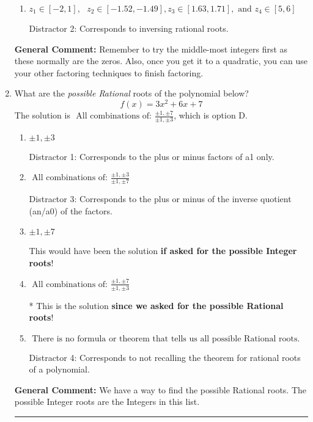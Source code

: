 \documentclass{extbook}[14pt]
\newcommand{\litem}[1]{\item #1

\rule{\textwidth}{0.4pt}}
\begin{document}
\begin{enumerate}
{\begin{enumerate}[label=\Alph*.]
* This is the solution!
\item \( z_1 \in [-2, 1], \text{   }  z_2 \in [-1.52, -1.49], z_3 \in [1.63, 1.71], \text{   and   } z_4 \in [5, 6] \)

 Distractor 2: Corresponds to inversing rational roots.
\end{enumerate}

\textbf{General Comment:} Remember to try the middle-most integers first as these normally are the zeros. Also, once you get it to a quadratic, you can use your other factoring techniques to finish factoring.
}
\litem{
What are the \textit{possible Rational} roots of the polynomial below?
\[ f(x) = 3x^{2} +6 x + 7 \]The solution is \( \text{ All combinations of: }\frac{\pm 1,\pm 7}{\pm 1,\pm 3} \), which is option D.\begin{enumerate}[label=\Alph*.]
\item \( \pm 1,\pm 3 \)

 Distractor 1: Corresponds to the plus or minus factors of a1 only.
\item \( \text{ All combinations of: }\frac{\pm 1,\pm 3}{\pm 1,\pm 7} \)

 Distractor 3: Corresponds to the plus or minus of the inverse quotient (an/a0) of the factors. 
\item \( \pm 1,\pm 7 \)

This would have been the solution \textbf{if asked for the possible Integer roots}!
\item \( \text{ All combinations of: }\frac{\pm 1,\pm 7}{\pm 1,\pm 3} \)

* This is the solution \textbf{since we asked for the possible Rational roots}!
\item \( \text{ There is no formula or theorem that tells us all possible Rational roots.} \)

 Distractor 4: Corresponds to not recalling the theorem for rational roots of a polynomial.
\end{enumerate}

\textbf{General Comment:} We have a way to find the possible Rational roots. The possible Integer roots are the Integers in this list.
}
\end{enumerate}
\end{document}
